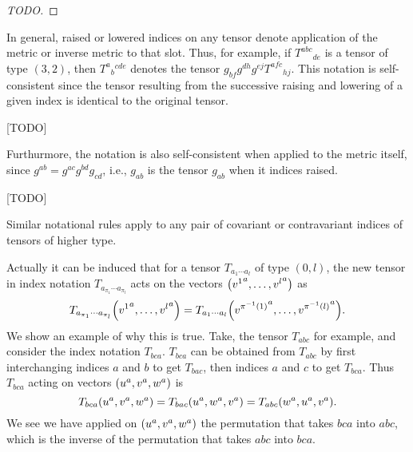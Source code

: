 \documentclass{note}
\numberwithin{equation}{chapter}
\begin{document}
\begin{proof}
    [TODO]
\end{proof}

\begin{quotebar}
    In general, raised or lowered indices on any tensor denote application of the
    metric or inverse metric to that slot. Thus, for example, if $T^{abc}{}_{de}$
    is a tensor of type $(3,2)$, then $T^a{}_b{}^{cde}$ denotes the tensor
    $g_{bf}g^{dh}g^{ej}T^{afc}{}_{hj}$. This notation is self-consistent since the
    tensor resulting from the successive raising and lowering of a given index is
    identical to the original tensor.
\end{quotebar}

[TODO]

\begin{quotebar}
    Furthurmore, the notation is also self-consistent when applied to the metric
    itself, since $g^{ab} = g^{ac}g^{bd}g_{cd}$, i.e., $g_{ab}$ is the tensor
    $g_{ab}$ when it indices raised.
\end{quotebar}

[TODO]

\begin{quotebar}
    Similar notational rules apply to any pair of covariant or contravariant
    indices of tensors of higher type.
\end{quotebar}

Actually it can be induced that for a tensor $T_{a_1\cdots a_l}$ of type $(0,
    l)$, the new tensor in index notation $T_{a_{\pi_1}\cdots a_{\pi_l}}$ acts on
the vectors $\prn{{v^1}^a, \dots, {v^l}^a}$ as
\begin{equation*}
    T_{a_{\pi_1}\cdots a_{\pi_l}} \prn{{v^1}^a, \dots, {v^l}^a} = T_{a_1\cdots a_l}
    \prn{{v^{\pi^{-1}(1)}}^a, \dots, {v^{\pi^{-1}(l)}}^a}.
\end{equation*}
We show an example of why this is true. Take, the tensor $T_{abc}$ for example,
and consider the index notation $T_{bca}$. $T_{bca}$ can be obtained from
$T_{abc}$ by first interchanging indices $a$ and $b$ to get $T_{bac}$, then
indices $a$ and $c$ to get $T_{bca}$. Thus $T_{bca}$ acting on vectors
$\prn{u^a, v^a, w^a}$ is
\begin{equation*}
    T_{bca} \prn{u^a, v^a, w^a} = T_{bac} \prn{u^a, w^a, v^a} = T_{abc} \prn{w^a,
        u^a, v^a}.
\end{equation*}
We see we have applied on $\prn{u^a, v^a, w^a}$ the permutation that takes
$bca$ into $abc$, which is the inverse of the permutation that takes $abc$ into
$bca$.
\end{document}
